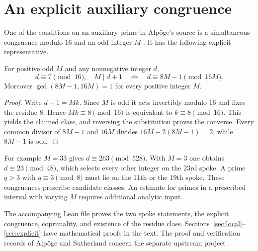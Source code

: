 \section{An explicit auxiliary congruence}\label{sec:lean}
One of the conditions on an auxiliary prime in Alpöge's source is a
simultaneous congruence modulo $16$ and an odd integer $M$ \cite{source}.
It has the following explicit representative.
\begin{prop}\label{prop:crt}
For positive odd $M$ and any nonnegative integer $d$,
\[
 d\equiv7\pmod {16},\quad M\mid d+1
 \quad\Longleftrightarrow\quad d\equiv8M-1\pmod{16M}.
\]
Moreover $\gcd(8M-1,16M)=1$ for every positive integer $M$.
\end{prop}
\begin{proof}
Write $d+1=Mk$. Since $M$ is odd it acts invertibly modulo $16$
and fixes the residue $8$. Hence $Mk\equiv8\pmod{16}$ is
equivalent to $k\equiv8\pmod{16}$. This yields the claimed class,
and reversing the substitution proves the converse. Every common
divisor of $8M-1$ and $16M$ divides $16M-2(8M-1)=2$, while $8M-1$
is odd.
\end{proof}
For example $M=33$ gives $d\equiv263\pmod{528}$. With $M=3$ one
obtains $d\equiv23\pmod{48}$, which selects every other integer on
the $23$rd spoke. A prime $q>3$ with $q\equiv3\pmod8$ must lie on
the $11$th or the $19$th spoke. These congruences prescribe candidate
classes. An estimate for primes in a prescribed interval with varying
$M$ requires additional analytic input.

The accompanying Lean file proves the two spoke statements, the
explicit congruence, coprimality, and existence of the residue class.
Sections~\ref{sec:local}--\ref{sec:explicit} have mathematical proofs
in the text. The proof and verification records of Alpöge and
Sutherland concern the separate upstream project \cite{alpoge,sutherland}.
